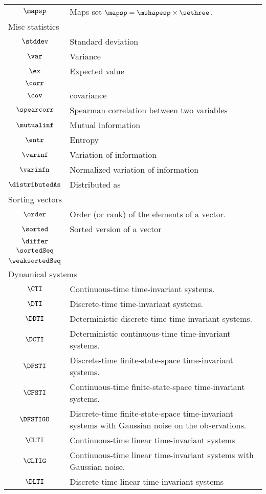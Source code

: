 \begin{longtable}{cl}
 $\mapsp$ &  Maps set $\mapsp = \mshapesp \times \sethree$.\\ 
 \multicolumn{2}{l}{Misc statistics}\\ 
 \hline
$\stddev$ &  Standard deviation\\ 
 $\var$ &  Variance\\ 
 $\ex$ &  Expected value\\ 
 $\corr$ & \\ 
 $\cov$ &  covariance\\ 
 $\spearcorr$ &  Spearman correlation between two variables\\ 
 $\mutualinf$ &  Mutual information\\ 
 $\entr$ &  Entropy\\ 
 $\varinf$ &  Variation of information\\ 
 $\varinfn$ &  Normalized variation of information\\ 
 $\distributedAs$ &  Distributed as\\ 
 \multicolumn{2}{l}{Sorting vectors}\\ 
 \hline
$\order$ &  Order (or rank) of the elements of a vector.\\ 
 $\sorted$ &  Sorted version of a vector\\ 
 $\differ$ & \\ 
 $\sortedSeq$ & \\ 
 $\weaksortedSeq$ & \\ 
 \multicolumn{2}{l}{Dynamical systems}\\ 
 \hline
$\CTI$ &  Continuous-time time-invariant systems.\\ 
 $\DTI$ &  Discrete-time time-invariant systems.\\ 
 $\DDTI$ &  Deterministic discrete-time time-invariant systems.\\ 
 $\DCTI$ &  Deterministic continuous-time time-invariant systems.\\ 
 $\DFSTI$ &  Discrete-time finite-state-space time-invariant systems.\\ 
 $\CFSTI$ &  Continuous-time finite-state-space time-invariant systems.\\ 
 $\DFSTIGO$ &  Discrete-time finite-state-space time-invariant systems with Gaussian noise on the observations.\\ 
 $\CLTI$ &  Continuous-time linear time-invariant systems\\ 
 $\CLTIG$ &  Continuous-time linear time-invariant systems with Gaussian noise.\\ 
 $\DLTI$ &  Discrete-time linear time-invariant systems\\ 

\end{longtable}
